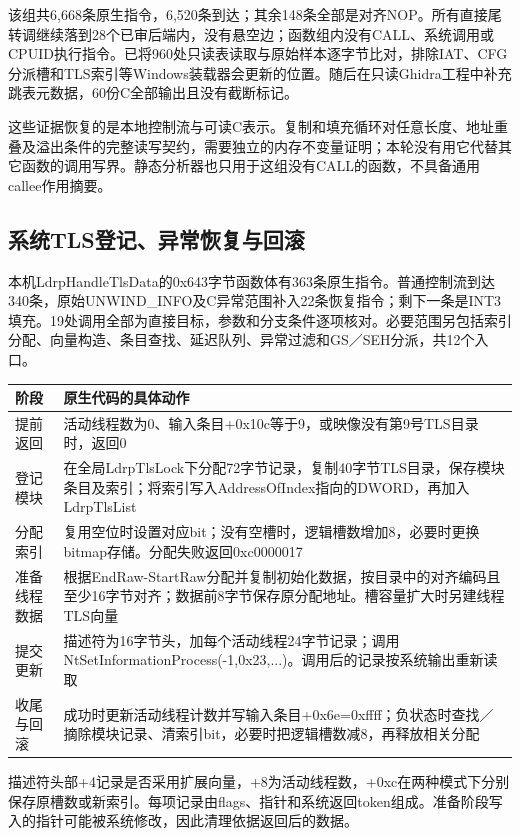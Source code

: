 \documentclass[UTF8,a4paper,zihao=5,fontset=windows]{ctexart}
\newcommand{\code}[1]{{\ttfamily\small #1}}
\begin{document}
该组共6,668条原生指令，6,520条到达；其余148条全部是对齐NOP。所有直接尾转调继续落到28个已审后端内，没有悬空边；函数组内没有CALL、系统调用或CPUID执行指令。已将960处只读表读取与原始样本逐字节比对，排除IAT、CFG分派槽和TLS索引等Windows装载器会更新的位置。随后在只读Ghidra工程中补充跳表元数据，60份C全部输出且没有截断标记。

这些证据恢复的是本地控制流与可读C表示。复制和填充循环对任意长度、地址重叠及溢出条件的完整读写契约，需要独立的内存不变量证明；本轮没有用它代替其它函数的调用写界。静态分析器也只用于这组没有CALL的函数，不具备通用callee作用摘要。

\subsection{系统TLS登记、异常恢复与回滚}
\label{app:ntdll_tls}
本机\code{LdrpHandleTlsData}的\code{0x643}字节函数体有363条原生指令。普通控制流到达340条，原始\code{UNWIND\_INFO}及C异常范围补入22条恢复指令；剩下一条是\code{INT3}填充。19处调用全部为直接目标，参数和分支条件逐项核对。必要范围另包括索引分配、向量构造、条目查找、延迟队列、异常过滤和GS／SEH分派，共12个入口。

\begin{longtable}{@{}L{25mm}L{125mm}@{}}\toprule 阶段 & 原生代码的具体动作\\\midrule\endhead
提前返回 & 活动线程数为0、输入条目\code{+0x10c}等于9，或映像没有第9号TLS目录时，返回0\\
登记模块 & 在全局\code{LdrpTlsLock}下分配72字节记录，复制40字节TLS目录，保存模块条目及索引；将索引写入\code{AddressOfIndex}指向的DWORD，再加入\code{LdrpTlsList}\\
分配索引 & 复用空位时设置对应bit；没有空槽时，逻辑槽数增加8，必要时更换bitmap存储。分配失败返回\code{0xc0000017}\\
准备线程数据 & 根据\code{EndRaw-StartRaw}分配并复制初始化数据，按目录中的对齐编码且至少16字节对齐；数据前8字节保存原分配地址。槽容量扩大时另建线程TLS向量\\
提交更新 & 描述符为16字节头，加每个活动线程24字节记录；调用\code{NtSetInformationProcess(-1,0x23,...)}。调用后的记录按系统输出重新读取\\
收尾与回滚 & 成功时更新活动线程计数并写输入条目\code{+0x6e=0xffff}；负状态时查找／摘除模块记录、清索引bit，必要时把逻辑槽数减8，再释放相关分配\\\bottomrule\end{longtable}

描述符头部\code{+4}记录是否采用扩展向量，\code{+8}为活动线程数，\code{+0xc}在两种模式下分别保存原槽数或新索引。每项记录由flags、指针和系统返回token组成。准备阶段写入的指针可能被系统修改，因此清理依据返回后的数据。
\end{document}
